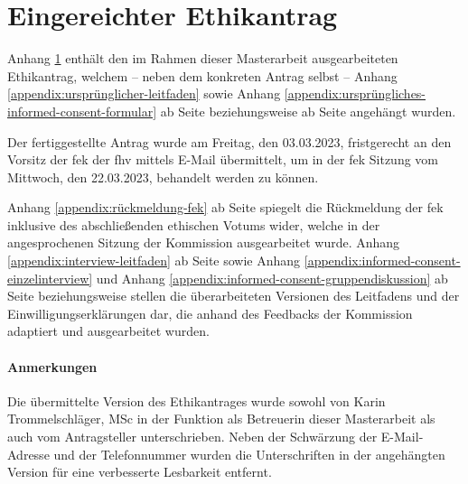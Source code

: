 \documentclass[a4paper,12pt,twoside]{scrreprt}
\begin{document}
\appendix

\cleardoublepage
\chapter{Eingereichter Ethikantrag}
\label{appendix:eingereichter-ethikantrag}

Anhang \ref{appendix:eingereichter-ethikantrag} enthält den im Rahmen dieser Masterarbeit ausgearbeiteten Ethikantrag, welchem -- neben dem konkreten Antrag selbst -- Anhang \ref{appendix:ursprünglicher-leitfaden} sowie Anhang \ref{appendix:ursprüngliches-informed-consent-formular} ab Seite \pageref{appendix:ursprünglicher-leitfaden} beziehungsweise ab Seite \pageref{appendix:ursprüngliches-informed-consent-formular} angehängt wurden.

Der fertiggestellte Antrag wurde am Freitag, den 03.03.2023, fristgerecht an den Vorsitz der \acl{fek} der \acl{fhv} mittels E-Mail übermittelt, um in der \ac{fek} Sitzung vom Mittwoch, den 22.03.2023, behandelt werden zu können.

\medskip 

Anhang \ref{appendix:rückmeldung-fek} ab Seite \pageref{appendix:rückmeldung-fek} spiegelt die Rückmeldung der \ac{fek} inklusive des abschließenden ethischen Votums wider, welche in der angesprochenen Sitzung der Kommission ausgearbeitet wurde. Anhang \ref{appendix:interview-leitfaden} ab Seite \pageref{appendix:interview-leitfaden} sowie Anhang \ref{appendix:informed-consent-einzelinterview} und Anhang \ref{appendix:informed-consent-gruppendiskussion} ab Seite \pageref{appendix:informed-consent-einzelinterview} beziehungsweise \pageref{appendix:informed-consent-gruppendiskussion} stellen die überarbeiteten Versionen des Leitfadens und der Einwilligungserklärungen dar, die anhand des Feedbacks der Kommission adaptiert und ausgearbeitet wurden.

\subsubsection*{Anmerkungen}
\label{appendix:anmerkungen-eingereichter-ethikantrag}
Die übermittelte Version des Ethikantrages wurde sowohl von Karin Trommelschläger, MSc in der Funktion als Betreuerin dieser Masterarbeit als auch vom Antragsteller unterschrieben. Neben der Schwärzung der E-Mail-Adresse und der Telefonnummer wurden die Unterschriften in der angehängten Version für eine verbesserte Lesbarkeit entfernt.


\end{document}
